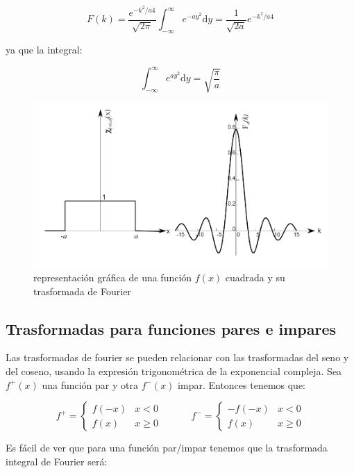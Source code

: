 \documentclass[12pt,a4paper]{book}
\newcommand{\D}{\mathrm{d}}
\newcommand{\inti}{\int_{-\infty}^{\infty}}
\newcommand{\tquad}{\quad  \quad \quad}
\begin{document}
$$ F(k) = \dfrac{e^{-k^2/a4}}{\sqrt{2 \pi}} \inti e^{-a y^2} \D y = \dfrac{1}{\sqrt{2 a}} e^{-k^2/a4} $$

ya que la integral:

$$ \inti e^{ay^2} \D y =  \sqrt{\dfrac{\pi}{a}}  $$

\hrulefill

\begin{figure}[h!] \centering
\includegraphics[scale=0.5]{trasformadafourier1.png}
\caption{representación gráfica de una función $f(x)$ cuadrada y su trasformada de Fourier}
\label{Fig:6.2-1}
\end{figure}


\subsection{Trasformadas para funciones pares e impares} 

Las trasformadas de fourier se pueden relacionar con las trasformadas del seno y del coseno, usando la expresión trigonométrica de la exponencial compleja. Sea $f^+(x)$ una función par y otra $f^-(x)$ impar. Entonces tenemos que:

\begin{equation}
f^+ = \left\lbrace \begin{array}{ll} f(-x) & x < 0 \\ f(x) & x \geq 0 \end{array} \right. \tquad f^- = \left\lbrace \begin{array}{ll} -f(-x) & x < 0 \\ f(x) & x \geq 0 \end{array} \right.
\end{equation}


Es fácil de ver que para una función par/impar tenemos que la trasformada integral de Fourier será:
\end{document}
